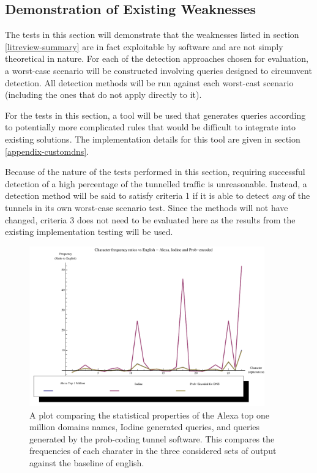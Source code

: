 \documentclass[12pt]{report}
\theoremstyle{remark}
\theoremstyle{definition}
\theoremstyle{definition}
\theoremstyle{definition}
\begin{document}
\subsection{Demonstration of Existing Weaknesses}
\label{test-weakness}
The tests
in this section will demonstrate that the weaknesses listed in section
\ref{litreview-summary} are in fact exploitable by software and are not simply
theoretical in nature. For each of the detection approaches chosen for
evaluation, a worst-case scenario will be constructed involving queries designed
to circumvent detection. All detection methods will be run against each
worst-cast scenario (including the ones that do not apply directly to it).

For the tests in this section, a tool will be used that generates queries
according to potentially more complicated rules that would be difficult to
integrate into existing solutions. The implementation details for this tool are
given in section \ref{appendix-customdns}.

Because of the nature of the tests performed in this section, requiring
successful detection of a high percentage of the tunnelled traffic is
unreasonable. Instead, a detection method will be said to satisfy criteria 1 if
it is able to detect \emph{any} of the tunnels in its own worst-case scenario
test. Since the methods will not have changed, criteria 3 does not need to be
evaluated here as the results from the existing implementation testing will be
used.

\begin{figure}
\centering
\includegraphics[width=4in]{figures/alexa_iodine_prob_v_english-r.pdf}
\caption[DNS Query, Iodine and Prob-coded Comparison - Ratio]{A plot comparing the statistical properties of the Alexa top one million domains names, Iodine generated queries, and queries generated by the prob-coding tunnel software. This compares the frequencies of each charater in the three considered sets of output against the baseline of english.}
\label{FIGURE_alexa-iodine-prob-v-english-r}
\end{figure}
\end{document}
